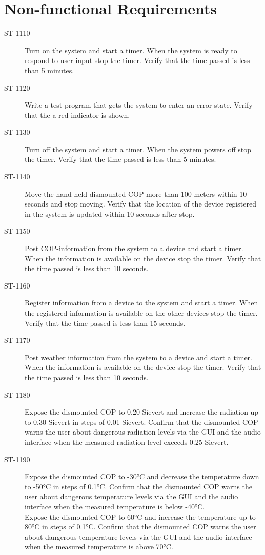 \section{Non-functional Requirements}

\begin{description}
\item[ST-1110] Turn on the system and start a timer. When the system is ready to respond to user input stop the timer. Verify that the time passed is less than 5 minutes.

\item[ST-1120]Write a test program that gets the system to enter an error state. Verify that the a red indicator is shown. 

\item[ST-1130] Turn off the system and start a timer. When the system powers off stop the timer. Verify that the time passed is less than 5 minutes.

\item[ST-1140]Move the hand-held dismounted COP more than 100 meters within 10 seconds and stop moving. Verify that the location of the device registered in the system is updated within 10 seconds after stop. 

\item[ST-1150]Post COP-information from the system to a device and start a timer. When the information is available on the device stop the timer. Verify that the time passed is less than 10 seconds. 

\item[ST-1160]Register information from a device to the system and start a timer. When the registered information is available on the other devices stop the timer. Verify that the time passed is less than 15 seconds. 

\item[ST-1170]Post weather information from the system to a device and start a timer. When the information is available on the device stop the timer. Verify that the time passed is less than 10 seconds. 

\item[ST-1180] Expose the dismounted COP to 0.20 Sievert and increase the radiation up to 0.30 Sievert in steps of 0.01 Sievert. Confirm that the dismounted COP warns the user about dangerous radiation levels via the GUI and the audio interface when the measured radiation level exceeds 0.25 Sievert. 

\item[ST-1190] Expose the dismounted COP to -30°C and decrease the temperature down to -50°C in steps of 0.1°C. Confirm that the dismounted COP warns the user about dangerous temperature levels via the GUI and the audio interface when the measured temperature is below -40°C.\\
Expose the dismounted COP to 60°C and increase the temperature up to 80°C in steps of 0.1°C. Confirm that the dismounted COP warns the user about dangerous temperature levels via the GUI and the audio interface when the measured temperature is above 70°C. 


\end{description}
